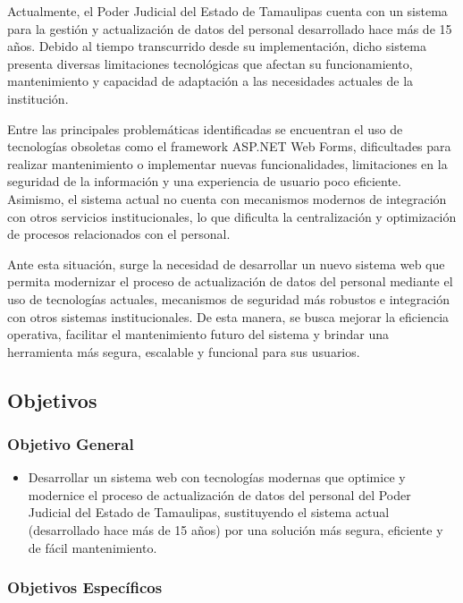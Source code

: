 Actualmente, el Poder Judicial del Estado de Tamaulipas cuenta con un sistema para la gestión y actualización de datos del personal desarrollado hace más de 15 años. Debido al tiempo transcurrido desde su implementación, dicho sistema presenta diversas limitaciones tecnológicas que afectan su funcionamiento, mantenimiento y capacidad de adaptación a las necesidades actuales de la institución.

Entre las principales problemáticas identificadas se encuentran el uso de tecnologías obsoletas como el framework ASP.NET Web Forms, dificultades para realizar mantenimiento o implementar nuevas funcionalidades, limitaciones en la seguridad de la información y una experiencia de usuario poco eficiente. Asimismo, el sistema actual no cuenta con mecanismos modernos de integración con otros servicios institucionales, lo que dificulta la centralización y optimización de procesos relacionados con el personal.

Ante esta situación, surge la necesidad de desarrollar un nuevo sistema web que permita modernizar el proceso de actualización de datos del personal mediante el uso de tecnologías actuales, mecanismos de seguridad más robustos e integración con otros sistemas institucionales. De esta manera, se busca mejorar la eficiencia operativa, facilitar el mantenimiento futuro del sistema y brindar una herramienta más segura, escalable y funcional para sus usuarios.
\subsection{Objetivos}
\label{sec:objetivos}

\subsubsection{Objetivo General}
\label{subsec:objetivo_general}

\begin{itemize}
    \item \textbf{} Desarrollar un sistema web con tecnologías modernas que optimice y modernice el proceso de actualización de datos del personal del Poder Judicial del Estado de Tamaulipas, sustituyendo el sistema actual (desarrollado hace más de 15 años) por una solución más segura, eficiente y de fácil mantenimiento.
\end{itemize}

\subsubsection{Objetivos Específicos}
\label{subsec:objetivos_especificos}

